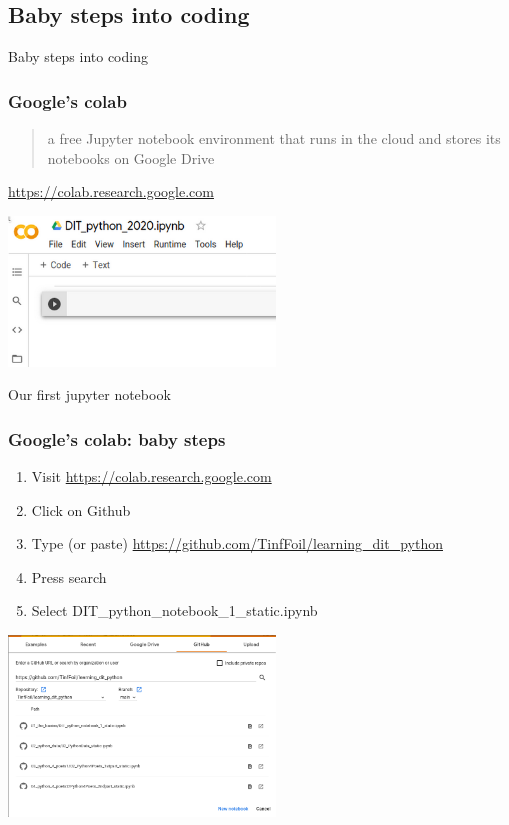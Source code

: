 \documentclass[xcolor=x11names,handout]{beamer}
\newcommand{\light}[1]{\textcolor{gray}{#1}}
\begin{document}
\begin{frame}
\section{Baby steps into coding}
\centering
\alert{Baby steps into coding}
\end{frame}

\begin{frame}
\frametitle{Google’s colab}

\begin{quote}
a free Jupyter notebook environment that runs in the cloud and stores its 
notebooks on Google Drive
\end{quote}

\begin{flushright}
\light{\url{https://colab.research.google.com}}
\end{flushright}				\pause 

\begin{center}
 \includegraphics[width=71mm]{img/jupyter_dit.png}
\end{center}

Our first jupyter notebook
\end{frame}
 
\begin{frame}
\frametitle{Google’s colab: baby steps}

\begin{enumerate}
\item Visit \url{https://colab.research.google.com}
\item Click on Github
\item Type (or paste) \url{https://github.com/TinfFoil/learning_dit_python}
\item Press search
\item Select 
\alert{DIT\_python\_notebook\_1\_static.ipynb}
\end{enumerate}

\begin{center}
 \includegraphics[width=71mm]{img/colab_git_import.png}
\end{center}
\end{frame}
\end{document}
